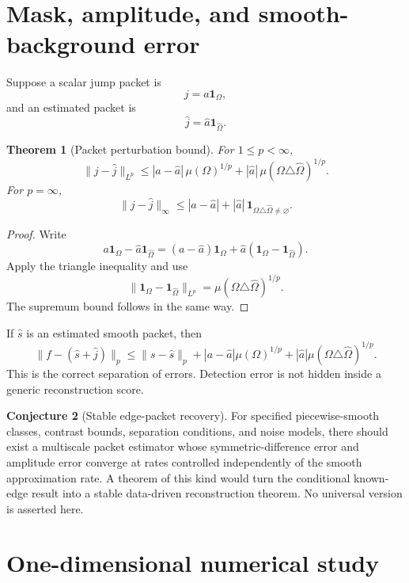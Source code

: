 \documentclass[11pt]{article}
\newtheorem{theorem}{Theorem}[section]
\theoremstyle{definition}
\newtheorem{conjecture}[theorem]{Conjecture}
\theoremstyle{remark}
\begin{document}
\section{Mask, amplitude, and smooth-background error}

Suppose a scalar jump packet is
\[
j=a\mathbf 1_{\Omega},
\]
and an estimated packet is
\[
\widehat j=\widehat a\mathbf 1_{\widehat\Omega}.
\]

\begin{theorem}[Packet perturbation bound]
For $1\le p<\infty$,
\[
\boxed{
\|j-\widehat j\|_{L^p}
\le
|a-\widehat a|\,\mu(\Omega)^{1/p}
+
|\widehat a|\,\mu(\Omega\triangle\widehat\Omega)^{1/p}.
}
\]
For $p=\infty$,
\[
\|j-\widehat j\|_{\infty}
\le |a-\widehat a|+|\widehat a|\,
\mathbf 1_{\Omega\triangle\widehat\Omega\ne\varnothing}.
\]
\end{theorem}

\begin{proof}
Write
\[
a\mathbf 1_{\Omega}-\widehat a\mathbf 1_{\widehat\Omega}
=(a-\widehat a)\mathbf 1_{\Omega}
+\widehat a(\mathbf 1_{\Omega}-\mathbf 1_{\widehat\Omega}).
\]
Apply the triangle inequality and use
\[
\|\mathbf 1_{\Omega}-\mathbf 1_{\widehat\Omega}\|_{L^p}
=\mu(\Omega\triangle\widehat\Omega)^{1/p}.
\]
The supremum bound follows in the same way.
\end{proof}

If $\widehat s$ is an estimated smooth packet, then
\[
\boxed{
\|f-(\widehat s+\widehat j)\|_p
\le
\|s-\widehat s\|_p
+|a-\widehat a|\mu(\Omega)^{1/p}
+|\widehat a|\mu(\Omega\triangle\widehat\Omega)^{1/p}.
}
\]
This is the correct separation of errors. Detection error is not hidden inside a generic reconstruction score.

\begin{conjecture}[Stable edge-packet recovery]
For specified piecewise-smooth classes, contrast bounds, separation conditions, and noise models, there should exist a multiscale packet estimator whose symmetric-difference error and amplitude error converge at rates controlled independently of the smooth approximation rate. A theorem of this kind would turn the conditional known-edge result into a stable data-driven reconstruction theorem. No universal version is asserted here.
\end{conjecture}

\section{One-dimensional numerical study}
\end{document}
